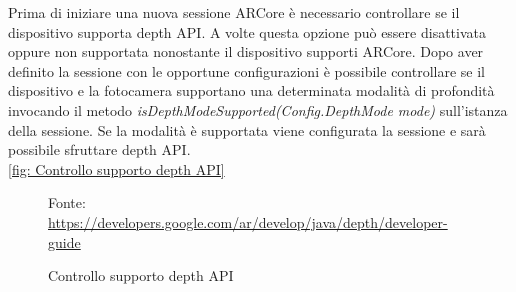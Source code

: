 \documentclass[crop=false, class=book]{standalone}
\begin{document}
		Prima di iniziare una nuova sessione ARCore è necessario controllare se il dispositivo supporta depth API. A volte 				questa opzione può essere disattivata oppure non supportata nonostante il dispositivo supporti ARCore. Dopo aver 				definito la sessione con le opportune configurazioni è possibile controllare se il dispositivo e la fotocamera 					supportano una determinata modalità di profondità invocando il metodo \textit{isDepthModeSupported(Config.DepthMode 			mode)} sull'istanza della sessione. Se la modalità è supportata viene configurata la sessione e sarà possibile 					sfruttare depth API.\\ \vref{fig: Controllo supporto depth API}\\
		\clearpage
		\begin{figure}
			\centering
			{Fonte: \url{https://developers.google.com/ar/develop/java/depth/developer-guide}}
			\caption{Controllo supporto depth API}
			\label{fig: Controllo supporto depth API}
		\end{figure}
		
\end{document}
